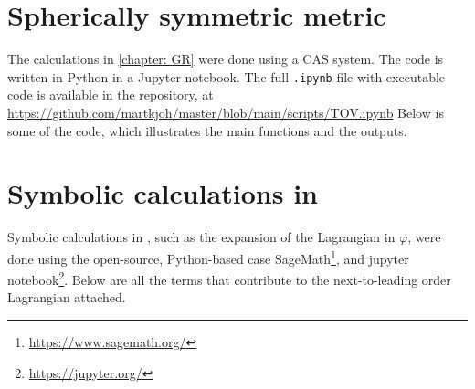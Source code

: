  

\section{Spherically symmetric metric}
The calculations in \autoref{chapter: GR} were done using a CAS system.
The code is written in Python in a Jupyter notebook.
The full \texttt{.ipynb} file with executable code is available in the repository, at \url{https://github.com/martkjoh/master/blob/main/scripts/TOV.ipynb}
Below is some of the code, which illustrates the main functions and the outputs.



\section{Symbolic calculations in \chpt}
\label{section: symbolic calculations}

Symbolic calculations in \chpt, such as the expansion of the Lagrangian in $\varphi$, were done using the open-source, Python-based case SageMath\footnote{\url{https://www.sagemath.org/}}, and jupyter notebook\footnote{\url{https://jupyter.org/}}.
Below are all the terms that contribute to the next-to-leading order Lagrangian attached.



